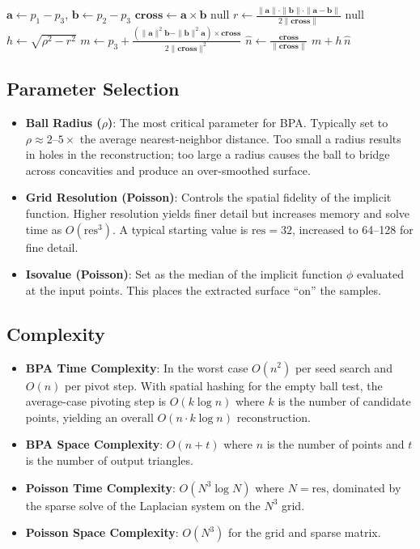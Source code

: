 \begin{algorithm}
\begin{algorithmic}[1]
    \State $\mathbf{a} \gets p_1 - p_3$, $\mathbf{b} \gets p_2 - p_3$
    \State $\mathbf{cross} \gets \mathbf{a} \times \mathbf{b}$
     \State \Return $\text{null}$ \EndIf {}
    \State $r \gets \frac{\|\mathbf{a}\| \cdot \|\mathbf{b}\| \cdot \|\mathbf{a} - \mathbf{b}\|}{2\|\mathbf{cross}\|}$
     \State \Return $\text{null}$ \EndIf
    \State $h \gets \sqrt{\rho^2 - r^2}$
    \State $m \gets p_3 + \frac{(\|\mathbf{a}\|^2 \mathbf{b} - \|\mathbf{b}\|^2 \mathbf{a}) \times \mathbf{cross}}{2\|\mathbf{cross}\|^2}$
    \State $\hat{n} \gets \frac{\mathbf{cross}}{\|\mathbf{cross}\|}$
    \State \Return $m + h\,\hat{n}$
\EndFunction
\end{algorithmic}
\end{algorithm}

\subsection{Parameter Selection}
\begin{itemize}
\item \textbf{Ball Radius ($\rho$)}: The most critical parameter for BPA. Typically set to $\rho \approx 2 \text{--} 5 \times$ the average nearest-neighbor distance. Too small a radius results in holes in the reconstruction; too large a radius causes the ball to bridge across concavities and produce an over-smoothed surface.
\item \textbf{Grid Resolution (Poisson)}: Controls the spatial fidelity of the implicit function. Higher resolution yields finer detail but increases memory and solve time as $O(\text{res}^3)$. A typical starting value is $\text{res} = 32$, increased to 64--128 for fine detail.
\item \textbf{Isovalue (Poisson)}: Set as the median of the implicit function $\phi$ evaluated at the input points. This places the extracted surface ``on'' the samples.
\end{itemize}

\subsection{Complexity}
\begin{itemize}
\item \textbf{BPA Time Complexity}: In the worst case $O(n^2)$ per seed search and $O(n)$ per pivot step. With spatial hashing for the empty ball test, the average-case pivoting step is $O(k \log n)$ where $k$ is the number of candidate points, yielding an overall $O(n \cdot k \log n)$ reconstruction.
\item \textbf{BPA Space Complexity}: $O(n + t)$ where $n$ is the number of points and $t$ is the number of output triangles.
\item \textbf{Poisson Time Complexity}: $O(N^3 \log N)$ where $N = \text{res}$, dominated by the sparse solve of the Laplacian system on the $N^3$ grid.
\item \textbf{Poisson Space Complexity}: $O(N^3)$ for the grid and sparse matrix.
\end{itemize}

